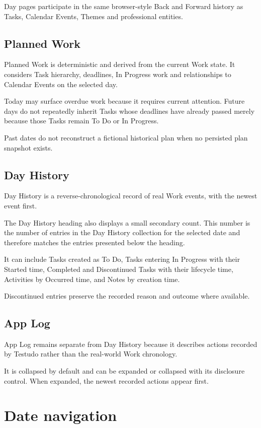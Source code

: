 \documentclass{testudomanual}
\begin{document}
Day pages participate in the same browser-style Back and Forward history as Tasks, Calendar Events, Themes and professional entities.

\subsection{Planned Work}

Planned Work is deterministic and derived from the current Work state. It considers Task hierarchy, deadlines, In Progress work and relationships to Calendar Events on the selected day.

Today may surface overdue work because it requires current attention. Future days do not repeatedly inherit Tasks whose deadlines have already passed merely because those Tasks remain To Do or In Progress.

Past dates do not reconstruct a fictional historical plan when no persisted plan snapshot exists.

\subsection{Day History}

Day History is a reverse-chronological record of real Work events, with the newest event first.

The Day History heading also displays a small secondary count. This number is the number of entries in the Day History collection for the selected date and therefore matches the entries presented below the heading.

It can include Tasks created as To Do, Tasks entering In Progress with their Started time, Completed and Discontinued Tasks with their lifecycle time, Activities by Occurred time, and Notes by creation time.

Discontinued entries preserve the recorded reason and outcome where available.

\subsection{App Log}

App Log remains separate from Day History because it describes actions recorded by Testudo rather than the real-world Work chronology.

It is collapsed by default and can be expanded or collapsed with its disclosure control. When expanded, the newest recorded actions appear first.

\section{Date navigation}
\end{document}
